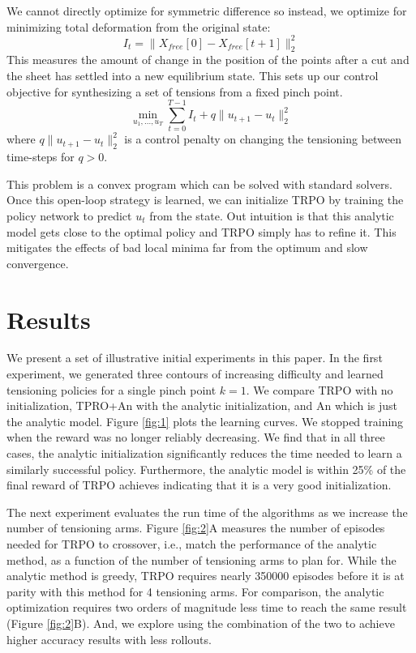 We cannot directly optimize for symmetric difference so instead, we optimize for minimizing total deformation from the original state:
\[ I_{t} =  \| X_{free}[0] - X_{free}[t+1] \|^2_2 \]
This measures the amount of change in the position of the points after a cut and the sheet has settled into a new equilibrium state.
This sets up our control objective for synthesizing a set of tensions from a fixed pinch point. 
\begin{equation}
   \min_{u_1,...,u_T} \sum_{t=0}^{T-1} I_{t} + q \|u_{t+1} - u_t \|_2^2  \label{obj}
\end{equation}
where $q \|u_{t+1} - u_t \|^2_2$ is a control penalty on changing the tensioning between time-steps for $q > 0$. 


This problem is a convex program which can be solved with standard solvers.
Once this open-loop strategy is learned, we can initialize TRPO by training the policy network to predict $u_{t}$ from the state.
Out intuition is that this analytic model gets close to the optimal policy and TRPO simply has to refine it.
This mitigates the effects of bad local minima far from the optimum and slow convergence.

\section{Results}
We present a set of illustrative initial experiments in this paper.
In the first experiment, we generated three contours of increasing difficulty and learned tensioning policies for a single pinch point $k=1$.
We compare TRPO with no initialization, TPRO+An with the analytic initialization, and An which is just the analytic model.
Figure \ref{fig:1} plots the learning curves.
We stopped training when the reward was no longer reliably decreasing.
We find that in all three cases, the analytic initialization significantly reduces the time needed to learn a similarly successful policy.
Furthermore, the analytic model is within 25\% of the final reward of TRPO achieves indicating that it is a very good initialization.

The next experiment evaluates the run time of the algorithms as we increase the number of tensioning arms.
Figure \ref{fig:2}A measures the number of episodes needed for TRPO to crossover, i.e., match the performance of the analytic method, as a function of the number of tensioning arms to plan for.
While the analytic method is greedy, TRPO requires nearly 350000 episodes before it is at parity with this method for 4 tensioning arms.
For comparison, the analytic optimization requires two orders of magnitude less time to reach the same result (Figure \ref{fig:2}B).
And, we explore using the combination of the two to achieve higher accuracy results with less rollouts.

